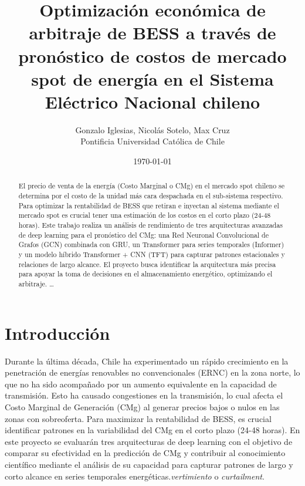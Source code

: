 \documentclass[twocolumn]{article}
\title{Optimización económica de arbitraje de BESS a través de pronóstico de 
costos de mercado spot de energía en el Sistema Eléctrico Nacional chileno}
\author{Gonzalo Iglesias, Nicolás Sotelo, Max Cruz  \\
	Pontificia Universidad Católica de Chile  \\
	}
\date{\today}
\begin{document}
\setlength{\droptitle}{-4em}     %
\addtolength{\droptitle}{-4pt}
\maketitle


\begin{abstract}
El precio de venta de la energía (Costo Marginal o CMg) en el mercado spot chileno se determina por el costo de la unidad más cara despachada en el sub-sistema respectivo. Para optimizar la rentabilidad de BESS que retiran e inyectan al sistema mediante el mercado spot es crucial tener una estimación de los costos en el corto plazo (24-48 horas). Este trabajo realiza un análisis de rendimiento de tres arquitecturas avanzadas de deep learning para el pronóstico del CMg: una Red Neuronal Convolucional de Grafos (GCN) combinada con GRU, un Transformer para series temporales (Informer) y un modelo híbrido Transformer + CNN (TFT) para capturar patrones estacionales y relaciones de largo alcance. El proyecto busca identificar la arquitectura más precisa para apoyar la toma de decisiones en el almacenamiento energético, optimizando el arbitraje.
 \ldots
\end{abstract}

\section{Introducción}
Durante la última década, Chile ha experimentado un rápido crecimiento en la penetración de energías renovables no convencionales (ERNC) en la zona norte, lo que no ha sido acompañado por un aumento equivalente en la capacidad de transmisión. Esto ha causado congestiones en la transmisión, lo cual afecta el Costo Marginal de Generación (CMg) al generar precios bajos o nulos en las zonas con sobreoferta. Para maximizar la rentabilidad de BESS, es crucial identificar patrones en la variabilidad del CMg en el corto plazo (24-48 horas). En este proyecto se evaluarán tres arquitecturas de deep learning con el objetivo de comparar su efectividad en la predicción de CMg y contribuir al conocimiento científico mediante el análisis de su capacidad para capturar patrones de largo y corto alcance en series temporales energéticas.\textit{vertimiento} o \textit{curtailment}.
 
\end{document}
